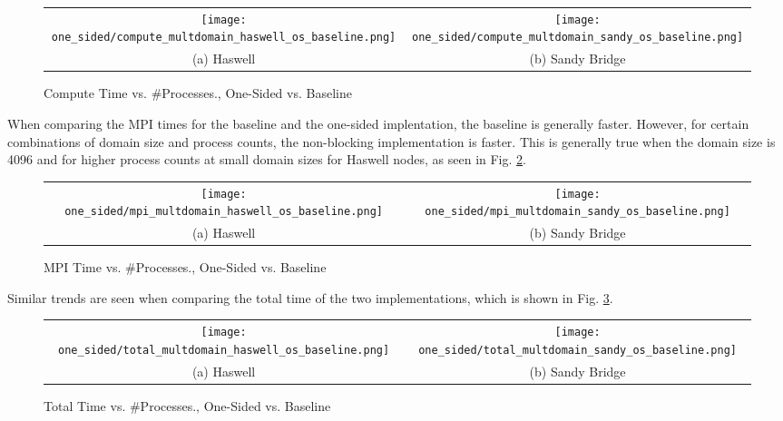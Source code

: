 \begin{enumerate}
    	\begin{figure}[h] %
		\hspace*{-0.25\linewidth}\begin{tabular}{cc}
			\texttt{[image: one\_sided/compute\_multdomain\_haswell\_os\_baseline.png]} & \texttt{[image: one\_sided/compute\_multdomain\_sandy\_os\_baseline.png]} \\
			(a) Haswell &  (b) Sandy Bridge\\[6pt]
		\end{tabular}
		\caption{Compute Time vs. \#Processes., One-Sided vs. Baseline}
		\label{fig:compute_multdomain_os_baseline}
	\end{figure}
	When comparing the MPI times for the baseline and the one-sided implentation, the baseline is generally faster. 
	However, for certain combinations of domain size and process counts, the non-blocking implementation is faster. 
	This is generally true when the domain size is 4096 and for higher process counts at small domain sizes for Haswell nodes, as seen in Fig. \ref{fig:mpi_multdomain_os_baseline}.
		\begin{figure}[h] %
		\hspace*{-0.25\linewidth}\begin{tabular}{cc}
			\texttt{[image: one\_sided/mpi\_multdomain\_haswell\_os\_baseline.png]} & \texttt{[image: one\_sided/mpi\_multdomain\_sandy\_os\_baseline.png]} \\
			(a) Haswell &  (b) Sandy Bridge\\[6pt]
		\end{tabular}
		\caption{MPI Time vs. \#Processes., One-Sided vs. Baseline}
		\label{fig:mpi_multdomain_os_baseline}
	\end{figure}
	Similar trends are seen when comparing the total time of the two implementations, which is shown in Fig. \ref{fig:total_multdomain_os_baseline}. 	
			\begin{figure}[h] %
		\hspace*{-0.25\linewidth}\begin{tabular}{cc}
			\texttt{[image: one\_sided/total\_multdomain\_haswell\_os\_baseline.png]} & \texttt{[image: one\_sided/total\_multdomain\_sandy\_os\_baseline.png]} \\
			(a) Haswell &  (b) Sandy Bridge\\[6pt]
		\end{tabular}
		\caption{Total Time vs. \#Processes., One-Sided vs. Baseline}
		\label{fig:total_multdomain_os_baseline}
	\end{figure}
	

\end{enumerate}
